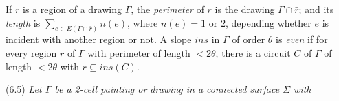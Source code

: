 If $r$ is a region of a drawing $\Gamma$, the \textit{perimeter} of $r$ is the drawing $\Gamma \cap \bar{r}$; and its \textit{length} is $\sum_{e \in E(\Gamma \cap \bar{r})} n(e)$, where $n(e) = 1$ or $2$, depending whether $e$ is incident with another region or not. A slope $ins$ in $\Gamma$ of order $\theta$ is \textit{even} if for every region $r$ of $\Gamma$ with perimeter of length $< 2\theta$, there is a circuit $C$ of $\Gamma$ of length $< 2\theta$ with $r \subseteq ins(C)$.

\stmt
(6.5) \textit{Let $\Gamma$ be a 2-cell painting or drawing in a connected surface $\Sigma$ with}
